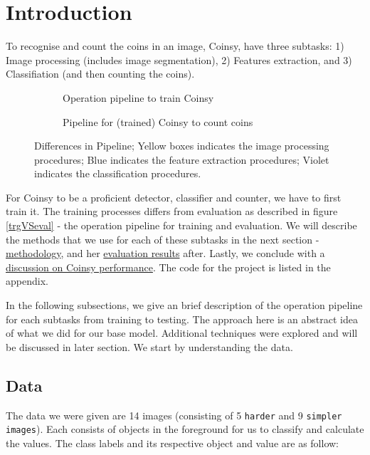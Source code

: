 \documentclass[main.tex]{subfiles}
\begin{document}
\section[intro]{Introduction\hypertarget{sec:intro}{}}
To recognise and count the coins in an image, Coinsy, have three subtasks: 1) Image processing (includes image segmentation), 2) Features extraction, and 3) Classifiation (and then counting the coins).

\begin{figure}[!t]
  \begin{subfigure}[t]{0.5\textwidth}
    \centering
    \resizebox{\linewidth}{!}{}
    \caption{Operation pipeline to train Coinsy} \label{trgPipe}
  \end{subfigure}
  \begin{subfigure}[t]{0.5\textwidth}
    \centering
    \resizebox{\linewidth}{!}{}
    \caption{Pipeline for (trained) Coinsy to count coins} \label{evalPipe}
  \end{subfigure}
  \caption{Differences in Pipeline; Yellow boxes indicates the image processing procedures; Blue indicates the feature extraction procedures; Violet indicates the classification procedures.} \label{trgVSeval}
\end{figure}

For Coinsy to be a proficient detector, classifier and counter, we have to first train it. The training processes differs from evaluation as described in figure \autoref{trgVSeval} - the operation pipeline for training and evaluation. We will describe the methods that we use for each of these subtasks in the next section - \hyperlink{method}{methodology}, and her \hyperlink{resut}{evaluation results} after. Lastly, we conclude with a \hyperlink{discussion}{discussion on Coinsy performance}. The code for the project is listed in the appendix.

In the following subsections, we give an brief description of the operation pipeline for each subtasks from training to testing. The approach here is an abstract idea of what we did for our base model. Additional techniques were explored and will be discussed in later section. We start by understanding the data.

\subsection*{Data} \label{sec:Data}
The data we were given are 14 images (consisting of 5 \texttt{harder} and 9 \texttt{simpler images}). Each consists of objects in the foreground for us to classify and calculate the values. The class labels and its respective object and value are as follow:
\end{document}
